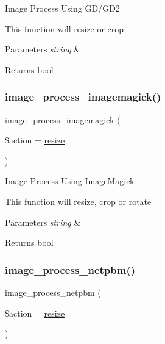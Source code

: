 Image Process Using G\+D/\+G\+D2

This function will resize or crop


\begin{DoxyParams}{Parameters}
{\em string} & \\
\hline
\end{DoxyParams}
\begin{DoxyReturn}{Returns}
bool 
\end{DoxyReturn}
\mbox{\label{class_c_i___image__lib_a141ec7c2c7cbe7a9a6a913d12fe973da}} 
\subsubsection{\texorpdfstring{image\+\_\+process\+\_\+imagemagick()}{image\_process\_imagemagick()}}
{\footnotesize\ttfamily image\+\_\+process\+\_\+imagemagick (\begin{DoxyParamCaption}\item[{}]{\$action = {\ttfamily \textquotesingle{}\mbox{\hyperlink{class_c_i___image__lib_a94e38a7d478ce07200a52c51497e598e}{resize}}\textquotesingle{}} }\end{DoxyParamCaption})}

Image Process Using Image\+Magick

This function will resize, crop or rotate


\begin{DoxyParams}{Parameters}
{\em string} & \\
\hline
\end{DoxyParams}
\begin{DoxyReturn}{Returns}
bool 
\end{DoxyReturn}
\mbox{\label{class_c_i___image__lib_ab40d1235dccf0611ef4fe5a6b0272dd3}} 
\subsubsection{\texorpdfstring{image\+\_\+process\+\_\+netpbm()}{image\_process\_netpbm()}}
{\footnotesize\ttfamily image\+\_\+process\+\_\+netpbm (\begin{DoxyParamCaption}\item[{}]{\$action = {\ttfamily \textquotesingle{}\mbox{\hyperlink{class_c_i___image__lib_a94e38a7d478ce07200a52c51497e598e}{resize}}\textquotesingle{}} }\end{DoxyParamCaption})}

